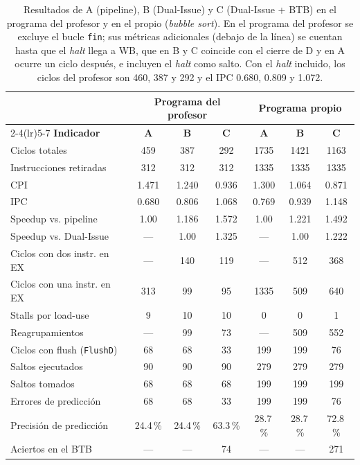 \documentclass[12pt,a4paper]{article}
\newcommand{\sig}[1]{\texttt{#1}}
\begin{document}
\begin{table}[H]
\centering
\small
\setlength{\tabcolsep}{5pt}
\begin{tabular}{@{}lcccccc@{}}
\toprule
& \multicolumn{3}{c}{\textbf{Programa del profesor}} & \multicolumn{3}{c}{\textbf{Programa propio}} \\
\cmidrule(lr){2-4}\cmidrule(lr){5-7}
\textbf{Indicador} & \textbf{A} & \textbf{B} & \textbf{C} & \textbf{A} & \textbf{B} & \textbf{C} \\
\midrule
Ciclos totales & 459 & 387 & 292 & 1735 & 1421 & 1163 \\
Instrucciones retiradas & 312 & 312 & 312 & 1335 & 1335 & 1335 \\
CPI & 1.471 & 1.240 & 0.936 & 1.300 & 1.064 & 0.871 \\
IPC & 0.680 & 0.806 & 1.068 & 0.769 & 0.939 & 1.148 \\
Speedup vs. pipeline & 1.00 & 1.186 & 1.572 & 1.00 & 1.221 & 1.492 \\
Speedup vs. Dual-Issue & --- & 1.00 & 1.325 & --- & 1.00 & 1.222 \\
\midrule
Ciclos con dos instr. en EX & --- & 140 & 119 & --- & 512 & 368 \\
Ciclos con una instr. en EX & 313 & 99 & 95 & 1335 & 509 & 640 \\
Stalls por load-use & 9 & 10 & 10 & 0 & 0 & 1 \\
Reagrupamientos & --- & 99 & 73 & --- & 509 & 552 \\
Ciclos con flush (\sig{FlushD}) & 68 & 68 & 33 & 199 & 199 & 76 \\
Saltos ejecutados & 90 & 90 & 90 & 279 & 279 & 279 \\
Saltos tomados & 68 & 68 & 68 & 199 & 199 & 199 \\
Errores de predicción & 68 & 68 & 33 & 199 & 199 & 76 \\
Precisión de predicción & 24.4\,\% & 24.4\,\% & 63.3\,\% & 28.7\,\% & 28.7\,\% & 72.8\,\% \\
Aciertos en el BTB & --- & --- & 74 & --- & --- & 271 \\
\bottomrule
\end{tabular}
\caption{Resultados de A (pipeline), B (Dual-Issue) y C (Dual-Issue + BTB) en el programa del profesor y en el propio (\textit{bubble sort}). En el programa del profesor se excluye el bucle \texttt{fin}; sus métricas adicionales (debajo de la línea) se cuentan hasta que el \textit{halt} llega a WB, que en B y C coincide con el cierre de D y en A ocurre un ciclo después, e incluyen el \textit{halt} como salto. Con el \textit{halt} incluido, los ciclos del profesor son 460, 387 y 292 y el IPC 0.680, 0.809 y 1.072.}
\label{tab:prof}
\label{tab:propio}
\end{table}
\end{document}
